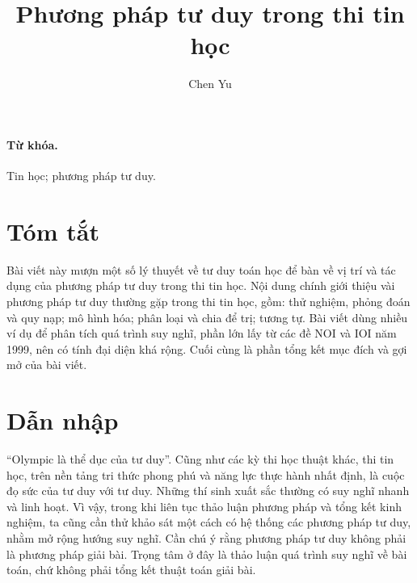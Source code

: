 \documentclass[11pt]{article}
\title{Phương pháp tư duy trong thi tin học}
\author{Chen Yu}
\date{}
\begin{document}
\maketitle


\paragraph{Từ khóa.}
Tin học; phương pháp tư duy.

\section*{Tóm tắt}

Bài viết này mượn một số lý thuyết về tư duy toán học để bàn về vị trí và tác
dụng của phương pháp tư duy trong thi tin học. Nội dung chính giới thiệu vài
phương pháp tư duy thường gặp trong thi tin học, gồm: thử nghiệm, phỏng đoán
và quy nạp; mô hình hóa; phân loại và chia để trị; tương tự. Bài viết dùng
nhiều ví dụ để phân tích quá trình suy nghĩ, phần lớn lấy từ các đề NOI và
IOI năm 1999, nên có tính đại diện khá rộng. Cuối cùng là phần tổng kết mục
đích và gợi mở của bài viết.

\section{Dẫn nhập}

``Olympic là thể dục của tư duy''. Cũng như các kỳ thi học thuật khác, thi tin
học, trên nền tảng tri thức phong phú và năng lực thực hành nhất định, là cuộc
đọ sức của tư duy với tư duy. Những thí sinh xuất sắc thường có suy nghĩ nhanh
và linh hoạt. Vì vậy, trong khi liên tục thảo luận phương pháp và tổng kết
kinh nghiệm, ta cũng cần thử khảo sát một cách có hệ thống các phương pháp tư
duy, nhằm mở rộng hướng suy nghĩ. Cần chú ý rằng phương pháp tư duy không phải
là phương pháp giải bài. Trọng tâm ở đây là thảo luận quá trình suy nghĩ về
bài toán, chứ không phải tổng kết thuật toán giải bài.
\end{document}
